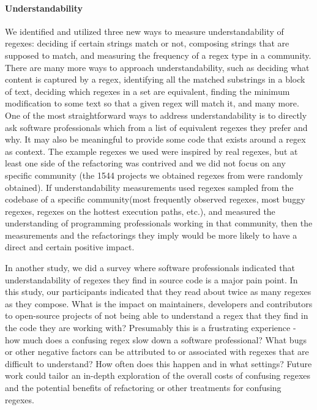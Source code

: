 \paragraph{Understandability}
We identified and utilized three new ways to measure understandability of regexes: deciding if certain strings match or not, composing strings that are supposed to match, and measuring the frequency of a regex type in a community.  There are many more ways to approach understandability, such as deciding what content is captured by a regex, identifying all the matched substrings in a block of text, deciding which regexes in a set are equivalent, finding the minimum modification to some text so that a given regex will match it, and many more.  One of the most straightforward ways to address understandability is to directly ask software professionals which from a list of equivalent regexes they prefer and why.  It may also be meaningful to provide some code that exists around a regex as context.  The example regexes we used were inspired by real regexes, but at least one side of the refactoring was contrived and we did not focus on any specific community (the 1544 projects we obtained regexes from were randomly obtained).  If understandability measurements used regexes sampled from the codebase of a specific community(most frequently observed regexes, most buggy regexes, regexes on the hottest execution paths, etc.), and measured the understanding of programming professionals working in that community, then the measurements and the refactorings they imply would be more likely to have a direct and certain positive impact.

In another study, we did a survey where software professionals indicated that understandability of regexes they find in source code is a major pain point.  In this study, our participants indicated that they read about twice as many regexes as they compose.  What is the impact on maintainers, developers and contributors to open-source projects of not being able to understand a regex that they find in the code they are working with?  Presumably this is a frustrating experience - how much does a confusing regex slow down a software professional?  What bugs or other negative factors can be attributed to or associated with regexes that are difficult to understand?  How often does this happen and in what settings?  Future work could tailor an in-depth exploration of the overall costs of confusing regexes and the potential benefits of refactoring or other treatments for confusing regexes.

